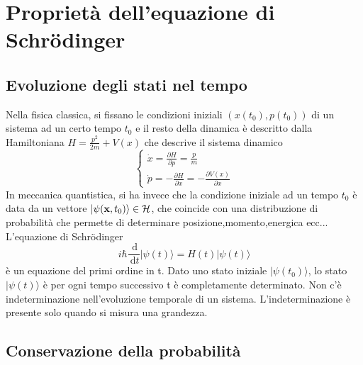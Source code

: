 \section{Propriet\`a dell'equazione di Schr\"odinger}

\subsection{Evoluzione degli stati nel tempo}

Nella fisica classica, si fissano le condizioni iniziali $(x(t_0),p(t_0))$ di un sistema ad un certo tempo $t_0$ e il resto della dinamica \`e descritto dalla Hamiltoniana $H = \frac{p^2}{2m} + V(x)$ che descrive il sistema dinamico
\begin{equation*}
	\left \{ \begin{array}{l}
		\dot{x} = \frac{\partial H}{\partial p} = \frac{p}{m}\\[0.2cm]
		\dot{p} = -\frac{\partial H}{\partial x} = -\frac{\partial V(x)}{\partial x}
	\end{array}\right.
\end{equation*}
In meccanica quantistica, si ha invece che la condizione iniziale ad un tempo $t_0$ \`e data da un vettore $| \psi(\bold{x},t_0) \rangle \in \mathcal{H}$, che coincide con una distribuzione di probabilit\`a che permette di determinare posizione,momento,energica ecc...
\\
L'equazione di Schr\"odinger 
\begin{equation*}
	i \hbar \frac{\mathrm{~d}}{\mathrm{~d} t}|\psi(t)\rangle=H(t)|\psi(t)\rangle
\end{equation*}
\`e un equazione del primi ordine in t. Dato uno stato iniziale $|\psi(t_0)\rangle$, lo stato $|\psi(t) \rangle $ \`e per ogni tempo successivo t \`e completamente determinato. Non c'\`e indeterminazione nell'evoluzione temporale di un sistema. L'indeterminazione \`e presente solo quando si misura una grandezza.
\subsection{Conservazione della probabilit\`a }

